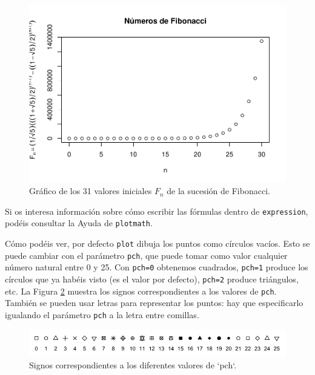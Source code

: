 \documentclass[
]{book}
\theoremstyle{definition}
\theoremstyle{definition}
\theoremstyle{definition}
\theoremstyle{remark}
\begin{document}
\begin{figure}

{\centering \includegraphics[width=0.9\linewidth]{07chap06_Graficos_I_files/figure-latex/F402-1} 

}

\caption{Gráfico de los 31 valores iniciales $F_n$ de la sucesión de Fibonacci.}\label{fig:F402}
\end{figure}

Si os interesa información sobre cómo escribir las fórmulas dentro de \texttt{expression}, podéis consultar la Ayuda de \texttt{plotmath}.

Cómo podéis ver, por defecto \texttt{plot} dibuja los puntos como círculos vacíos. Esto se puede cambiar con el parámetro \texttt{pch}, que puede tomar como valor cualquier número natural entre 0 y 25. Con \texttt{pch=0} obtenemos cuadrados, \texttt{pch=1} produce los círculos que ya habéis visto (es el valor por defecto), \texttt{pch=2} produce triángulos, etc. La Figura
\ref{fig:F403} muestra los signos correspondientes a los valores de \texttt{pch}. También se pueden usar letras para representar los puntos: hay que especificarlo igualando el parámetro \texttt{pch} a la letra entre comillas.

\begin{figure}

{\centering \includegraphics[width=0.9\linewidth]{AprendeR-Parte-I_files/figure-html/pchh} 

}

\caption{Signos correspondientes a los diferentes valores de `pch`.}\label{fig:F403}
\end{figure}
\end{document}
